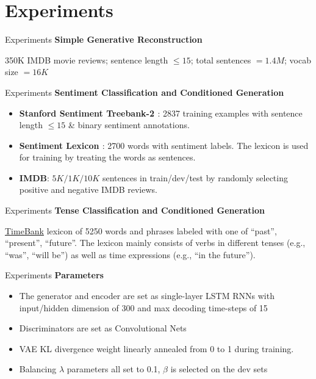\documentclass{beamer}
\begin{document}
\section{Experiments}
\begin{frame}{Experiments}
  \textbf{Simple Generative Reconstruction}

  350K IMDB movie reviews; sentence length $\leq 15$; total sentences $= 1.4M$; vocab size $= 16K$
\end{frame}

\begin{frame}{Experiments}
  \textbf{Sentiment Classification and Conditioned Generation}

  \begin{itemize}
    \item \textbf{Stanford Sentiment Treebank-2 \cite{socher2013recursive}}: 2837 training examples with sentence length $\leq 15$ \& binary sentiment annotations.
    \item \textbf{Sentiment Lexicon \cite{wilson2005recognizing}}:  2700 words with sentiment labels. The lexicon is used for training by treating the words as sentences.
    \item \textbf{IMDB}: $5K/1K/10K$ sentences in train/dev/test by randomly selecting positive and negative IMDB reviews.
  \end{itemize}
  
\end{frame}

\begin{frame}{Experiments}
  \textbf{Tense Classification and Conditioned Generation}

  \href{http://timeml.org}{TimeBank} lexicon of 5250 words and phrases labeled with one of {“past”, “present”, “future”}. The lexicon mainly consists of verbs in different tenses (e.g., “was”, “will be”) as well as time expressions (e.g., “in the future”).
\end{frame}

\begin{frame}{Experiments}
  \textbf{Parameters}
  \begin{itemize}
    \item The generator and encoder are set as single-layer LSTM RNNs with input/hidden dimension of 300 and max decoding time-steps of 15
    \item Discriminators are set as Convolutional Nets
    \item VAE KL divergence weight linearly annealed from 0 to 1 during training.
    \item Balancing $\lambda$ parameters all set to 0.1, $\beta$ is selected on the dev sets
  \end{itemize}
\end{frame}
\end{document}
